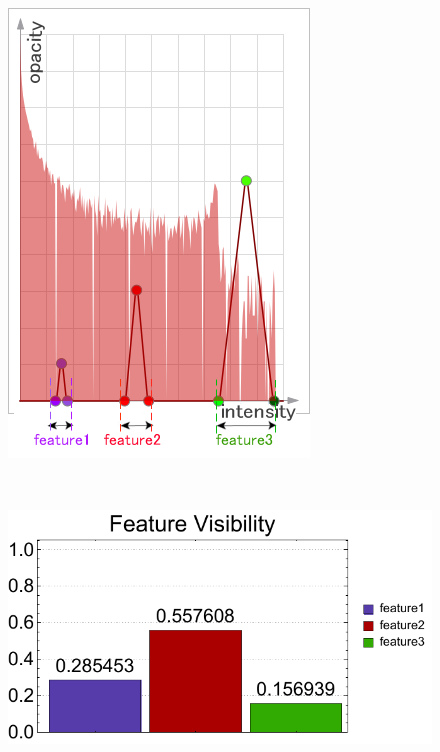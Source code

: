 \begin{figure}
\begin{minipage}{.15\textwidth}
	\includegraphics[width=1\linewidth]{figures/tf_nucleon_naive_proportional}
	\subcaption{}
\end{minipage}~
\begin{minipage}{.3\textwidth}
	\includegraphics[width=1\linewidth]{figures/nucleon_naive_proportional_visibility_chart}

\end{minipage}
\end{figure}
